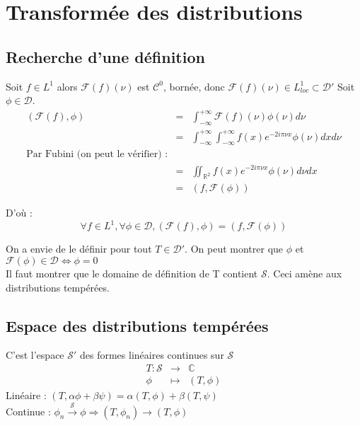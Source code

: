 \documentclass{article}
\begin{document}

\section{Transformée des distributions}
\subsection{Recherche d'une définition}
Soit $f\in L^1$ alors $\mathcal{F}(f)(\nu)$ est $\mathcal{C}^0$, bornée, donc $\mathcal{F}(f)(\nu) \in L^1_{loc} \subset \mathcal{D}'$
Soit $\phi \in \mathcal{D}$.
\begin{eqnarray*}
(\mathcal{F}(f),\phi)&=& \int_{-\infty}^{+\infty} \mathcal{F}(f)(\nu)\phi(\nu) d\nu \\
&=& \int_{-\infty}^{+\infty} \int_{-\infty}^{+\infty} f(x) e^{-2i\pi\nu x} \phi(\nu) dx d\nu \\
\text{Par Fubini (on peut le vérifier) :} \\
&=& \iint_{\mathbb{R}^2} f(x) e^{-2i\pi\nu x} \phi(\nu) d\nu dx \\
&=& (f,\mathcal{F}(\phi))
\end{eqnarray*}

D'où : \[\forall f\in L^1, \forall \phi\in\mathcal{D}, (\mathcal{F}(f),\phi)=(f,\mathcal{F}(\phi))\]

On a envie de le définir pour tout $T\in\mathcal{D}'$. On peut montrer que $\phi$ et $\mathcal{F}(\phi) \in \mathcal{D} \Leftrightarrow \phi=0$\\
Il faut montrer que le domaine de définition de T contient $\mathcal{S}$. Ceci amène aux distributions tempérées. 

\subsection{Espace des distributions tempérées}
C'est l'espace $\mathcal{S}'$ des formes linéaires continues sur $\mathcal{S}$
\begin{eqnarray*}
T : \mathcal{S} &\to& \mathbb{C} \\
\phi &\mapsto& (T,\phi)
\end{eqnarray*}
Linéaire : $(T,\alpha \phi + \beta \psi)=\alpha(T,\phi)+\beta(T,\psi)$ \\
Continue : $\phi_n \xrightarrow{\mathcal{S}}\phi \Rightarrow (T,\phi_n) \rightarrow (T,\phi)$
\end{document}
